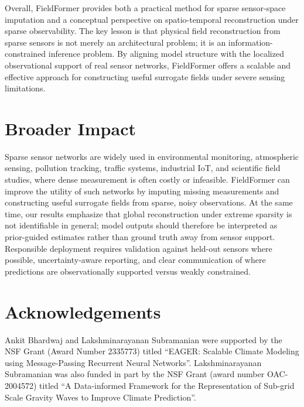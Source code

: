 Overall, FieldFormer provides both a practical method for sparse sensor-space imputation and a conceptual perspective on spatio-temporal reconstruction under sparse observability. The key lesson is that physical field reconstruction from sparse sensors is not merely an architectural problem; it is an information-constrained inference problem. By aligning model structure with the localized observational support of real sensor networks, FieldFormer offers a scalable and effective approach for constructing useful surrogate fields under severe sensing limitations.

\section*{Broader Impact}

Sparse sensor networks are widely used in environmental monitoring, atmospheric sensing, pollution tracking, traffic systems, industrial IoT, and scientific field studies, where dense measurement is often costly or infeasible. FieldFormer can improve the utility of such networks by imputing missing measurements and constructing useful surrogate fields from sparse, noisy observations. At the same time, our results emphasize that global reconstruction under extreme sparsity is not identifiable in general; model outputs should therefore be interpreted as prior-guided estimates rather than ground truth away from sensor support. Responsible deployment requires validation against held-out sensors where possible, uncertainty-aware reporting, and clear communication of where predictions are observationally supported versus weakly constrained.

\section*{Acknowledgements}
Ankit Bhardwaj and Lakshminarayanan Subramanian were supported by the NSF Grant (Award Number 2335773) titled ``EAGER: Scalable Climate Modeling using Message-Passing Recurrent Neural Networks''. Lakshminarayanan Subramanian was also funded in part by the NSF Grant (award number OAC-2004572) titled ``A Data-informed Framework for the Representation of Sub-grid Scale Gravity Waves to Improve Climate Prediction''.
